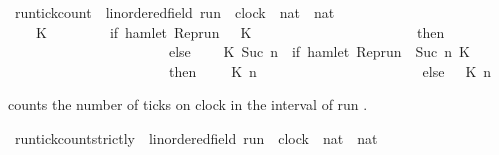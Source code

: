 \begin{isabellebody}
\begin{isamarkuptext}
\end{isamarkuptext}\isamarkuptrue%
\isamarkupfalse%
\ run{\isacharunderscore}tick{\isacharunderscore}count\ {\isacharcolon}{\isacharcolon}\ {\isacartoucheopen}{\isacharparenleft}{\isacharprime}{\isasymtau}{\isacharcolon}{\isacharcolon}linordered{\isacharunderscore}field{\isacharparenright}\ run\ {\isasymRightarrow}\ clock\ {\isasymRightarrow}\ nat\ {\isasymRightarrow}\ nat{\isacartoucheclose}\isanewline
\ \ {\isacharparenleft}{\isachardoublequoteopen}{\isacharhash}\isactrlsub {\isasymle}\ {\isacharunderscore}\ {\isacharunderscore}\ {\isacharunderscore}{\isachardoublequoteclose}{\isacharparenright}\isanewline
{}\isanewline
\ \ {\isacartoucheopen}{\isacharparenleft}{\isacharhash}\isactrlsub {\isasymle}\ {\isasymrho}\ K\ {}{\isacharparenright}\ \ \ \ \ \ \ {\isacharequal}\ {\isacharparenleft}if\ hamlet\ {\isacharparenleft}{\isacharparenleft}Rep{\isacharunderscore}run\ {\isasymrho}{\isacharparenright}\ {}\ K{\isacharparenright}\isanewline
\ \ \ \ \ \ \ \ \ \ \ \ \ \ \ \ \ \ \ \ \ \ \ then\ {}\isanewline
\ \ \ \ \ \ \ \ \ \ \ \ \ \ \ \ \ \ \ \ \ \ \ else\ {}{\isacharparenright}{\isacartoucheclose}\isanewline
{\isacharbar}\ {\isacartoucheopen}{\isacharparenleft}{\isacharhash}\isactrlsub {\isasymle}\ {\isasymrho}\ K\ {\isacharparenleft}Suc\ n{\isacharparenright}{\isacharparenright}\ {\isacharequal}\ {\isacharparenleft}if\ hamlet\ {\isacharparenleft}{\isacharparenleft}Rep{\isacharunderscore}run\ {\isasymrho}{\isacharparenright}\ {\isacharparenleft}Suc\ n{\isacharparenright}\ K{\isacharparenright}\isanewline
\ \ \ \ \ \ \ \ \ \ \ \ \ \ \ \ \ \ \ \ \ \ \ then\ {}\ {\isacharplus}\ {\isacharparenleft}{\isacharhash}\isactrlsub {\isasymle}\ {\isasymrho}\ K\ n{\isacharparenright}\isanewline
\ \ \ \ \ \ \ \ \ \ \ \ \ \ \ \ \ \ \ \ \ \ \ else\ {\isacharparenleft}{\isacharhash}\isactrlsub {\isasymle}\ {\isasymrho}\ K\ n{\isacharparenright}{\isacharparenright}{\isacartoucheclose}%
\begin{isamarkuptext}%
 counts the number of ticks on
  clock  in the interval \isatt{[0{\char`\,}\ n[} of run \isa{{\isasymrho}}.%
\end{isamarkuptext}\isamarkuptrue%
\isamarkupfalse%
\ run{\isacharunderscore}tick{\isacharunderscore}count{\isacharunderscore}strictly\ {\isacharcolon}{\isacharcolon}\ {\isacartoucheopen}{\isacharparenleft}{\isacharprime}{\isasymtau}{\isacharcolon}{\isacharcolon}linordered{\isacharunderscore}field{\isacharparenright}\ run\ {\isasymRightarrow}\ clock\ {\isasymRightarrow}\ nat\ {\isasymRightarrow}\ nat{\isacartoucheclose}\isanewline

\end{isabellebody}
